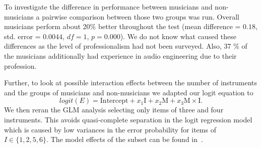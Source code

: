 \par
To investigate the difference in performance between musicians and non-musicians a pairwise comparison between those two groups was run. Overall musicians perform about 20\% better throughout the test (mean difference = $0.18$, std. error = $ 0.0044$, $df = 1$, $p=0.000$). We do not know what caused these differences as the level of professionalism had not been surveyed. Also, 37 \% of the musicians additionally had experience in audio engineering due to their profession.
\par
Further, to look at possible interaction effects between the number of instruments and the groups of musicians and non-musicians we adapted our logit equation to
\begin{equation}
    logit(E) =  \text{Intercept} + x_1 \text{I} + x_2 \text{M} + x_3 \text{M}\times\text{I} .
    \label{eq:logit_interactions}
\end{equation}
We then reran the GLM analysis selecting only items of three and four instruments. This avoids quasi-complete separation in the logit regression model which is caused by low variances in the error probability for items of $I \in \{1,2,5,6\}$.
The model effects of the subset can be found in~\cite{stoeter13}.

